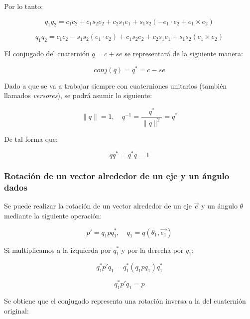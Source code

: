 \documentclass[10pt, a4paper]{report}
\begin{document}
Por lo tanto:

\begin{equation}
q_1 q_2 = c_1 c_2 + c_1 s_2 e_2 + c_2 s_1 e_1 + s_1 s_2 (-e_1 \cdot e_2 + e_1 \times e_2)
\end{equation}

\begin{equation}
q_1 q_2 = c_1 c_2 - s_1 s_2 (e_1 \cdot e_2) + c_1 s_2 e_2 + c_2 s_1 e_1 + s_1 s_2 (e_1 \times e_2)
\end{equation}

El conjugado del cuaternión $ q = c + s e $ se representará de la siguiente manera:

\begin{equation}
conj(q) = q^* = c - s e
\end{equation}

Dado a que se va a trabajar siempre con cuaterniones unitarios (también llamados \textit{versores}), se podrá asumir lo siguiente:

\begin{equation}
\|q\| = 1 , \quad q^{-1} = \frac{q^*}{\|q\|^2} = q^*
\end{equation}

De tal forma que:

\begin{equation}
qq^* = q^*q = 1
\end{equation}

\subsubsection{Rotación de un vector alrededor de un eje y un ángulo dados}

Se puede realizar la rotación de un vector alrededor de un eje $\vec{e}$ y un ángulo $\theta$ mediante la siguiente operación:

\begin{equation}
p' = q_1pq_1^*, \quad q_1 = q(\theta_1, \vec{e_1})
\end{equation}

Si multiplicamos a la izquierda por $q_1^*$ y por la derecha por $q_1$:

\begin{equation}
q_1^*p'q_1 = q_1^*(q_1pq_1)q_1^*
\end{equation}

\begin{equation}
q_1^*p'q_1 = p
\end{equation}

Se obtiene que el conjugado representa una rotación inversa a la del cuaternión original:
\end{document}
